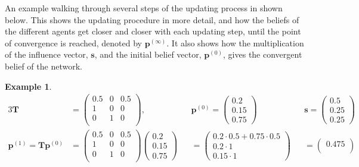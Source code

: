 \documentclass[a4paper, 12pt]{report}
\newtheorem{example}{Example}
\newcommand{\T}{\bm{T}}
\begin{document}
An example walking through several steps of the updating process in shown below. This shows the updating procedure in more detail, and how the beliefs of the different agents get closer and closer with each updating step, until the point of convergence is reached, denoted by $\bm{p}^{(\infty)}$. It also shows how the multiplication of the influence vector, $\bm{s}$, and the initial belief vector, $\bm{p}^{(0)}$, gives the convergent belief of the network.

\begin{example}
    \begin{alignat*}{3}
        \T &= 
        \begin{pmatrix}
            0.5 & 0 & 0.5 \\
            1 & 0 & 0 \\
            0 & 1 & 0 \\
        \end{pmatrix}, &&\bm{p}^{(0)} = 
        \begin{pmatrix}
            0.2 \\
            0.15 \\
            0.75
        \end{pmatrix} &&\bm{s} = 
        \begin{pmatrix}
            0.5 \\
            0.25 \\
            0.25
        \end{pmatrix}\\
        \bm{p}^{(1)} = \T\bm{p}^{(0)} &= 
        \begin{pmatrix}
            0.5 & 0 & 0.5 \\
            1 & 0 & 0 \\
            0 & 1 & 0 \\
        \end{pmatrix}
        \begin{pmatrix}
            0.2 \\
            0.15 \\
            0.75
        \end{pmatrix} &&= 
        \begin{pmatrix}
            0.2 \cdot 0.5 + 0.75 \cdot 0.5 \\
            0.2 \cdot 1 \\
            0.15 \cdot 1
        \end{pmatrix} &&= 
        \begin{pmatrix}
            0.475 \\

\end{pmatrix}
\end{alignat*}
\end{example}
\end{document}
